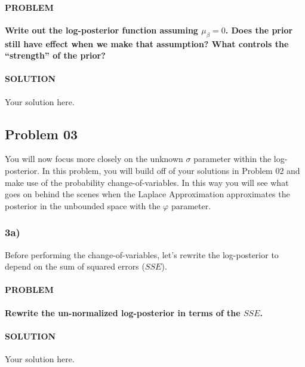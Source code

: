 \documentclass[
]{article}
\begin{document}
\hypertarget{problem-11}{%
\paragraph{PROBLEM}\label{problem-11}}

\textbf{Write out the log-posterior function assuming \(\mu_{\beta}=0\).
Does the prior still have effect when we make that assumption? What
controls the ``strength'' of the prior?}

\hypertarget{solution-11}{%
\paragraph{SOLUTION}\label{solution-11}}

Your solution here.

\hypertarget{problem-03}{%
\subsection{Problem 03}\label{problem-03}}

You will now focus more closely on the unknown \(\sigma\) parameter
within the log-posterior. In this problem, you will build off of your
solutions in Problem 02 and make use of the probability
change-of-variables. In this way you will see what goes on behind the
scenes when the Laplace Approximation approximates the posterior in the
unbounded space with the \(\varphi\) parameter.

\hypertarget{a-2}{%
\subsubsection{3a)}\label{a-2}}

Before performing the change-of-variables, let's rewrite the
log-posterior to depend on the sum of squared errors (\(SSE\)).

\hypertarget{problem-12}{%
\paragraph{PROBLEM}\label{problem-12}}

\textbf{Rewrite the un-normalized log-posterior in terms of the
\(SSE\).}

\hypertarget{solution-12}{%
\paragraph{SOLUTION}\label{solution-12}}

Your solution here.
\end{document}
